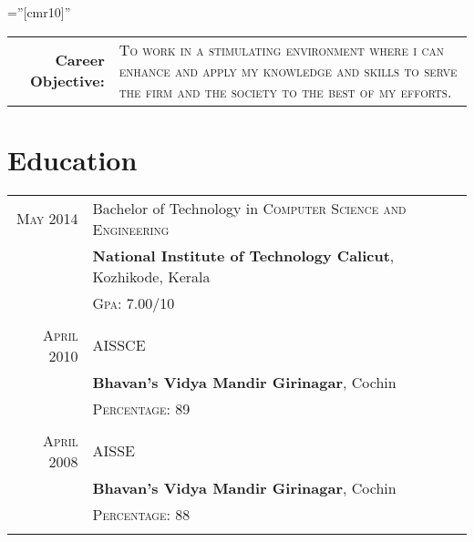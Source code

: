 \documentclass[a4paper,10pt]{article} %
\begin{document}
\pagestyle{empty} %

\font\fb=''[cmr10]'' %


\par{\bigskip\par} %

\begin{tabular}{rp{11cm}}	
\textbf{Career Objective:} &\textsc{To work in a stimulating environment where i can enhance and apply my knowledge and skills to serve the firm and the society to the best of my efforts.} \\
\end{tabular}


\section{Education}

\begin{tabular}{rl}	
\textsc{May} 2014 & Bachelor of Technology in \textsc{Computer Science and Engineering}\\
& \textbf{National Institute of Technology Calicut}, Kozhikode, Kerala\\
&\normalsize \textsc{Gpa}: 7.00/10\\
&\\


\textsc{April} 2010& AISSCE \\&\normalsize\textbf{Bhavan's Vidya Mandir Girinagar}, Cochin\\
&\normalsize \textsc{Percentage}: 89 \\
&\\


\textsc{April} 2008& AISSE \\&\normalsize\textbf{Bhavan's Vidya Mandir Girinagar}, Cochin\\
&\normalsize \textsc{Percentage}: 88 \\
&\\

\end{tabular}
\end{document}
